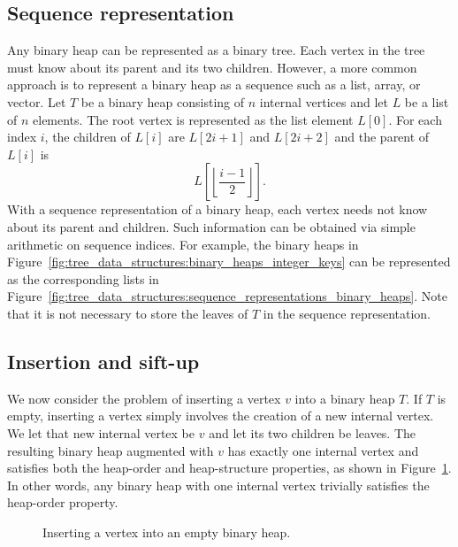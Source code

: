 
\subsection{Sequence representation}

Any binary heap can be represented as a binary tree. Each vertex in
the tree must know about its parent and its two children. However, a
more common approach is to represent a binary heap as a sequence such
as a list, array, or vector. Let $T$ be a binary heap consisting of
$n$ internal vertices and let $L$ be a list of $n$ elements. The root
vertex is represented as the list element $L[0]$. For each index $i$,
the children of $L[i]$ are $L[2i + 1]$ and $L[2i + 2]$ and the parent
of $L[i]$ is
\[
L\left[ \left\lfloor \frac{i - 1}{2} \right\rfloor \right].
\]
With a sequence representation of a binary heap, each vertex needs not
know about its parent and children. Such information can be obtained
via simple arithmetic on sequence indices. For example, the binary
heaps in
Figure~\ref{fig:tree_data_structures:binary_heaps_integer_keys} can be
represented as the corresponding lists in
Figure~\ref{fig:tree_data_structures:sequence_representations_binary_heaps}.
Note that it is not necessary to store the leaves of $T$ in the
sequence representation.



\subsection{Insertion and sift-up}
\label{subsec:tree_data_structures:insertion_sift_up}

We now consider the problem of inserting a vertex $v$ into a binary
heap $T$. If $T$ is empty, inserting a vertex simply involves the
creation of a new internal vertex. We let that new internal vertex be
$v$ and let its two children be leaves. The resulting binary heap
augmented with $v$ has exactly one internal vertex and satisfies both
the heap-order and heap-structure properties, as shown in
Figure~\ref{fig:tree_data_structures:insert_vertex_into_empty_binary_heap}.
In other words, any binary heap with one internal vertex trivially
satisfies the heap-order property.

\begin{figure}[!htbp]
\centering

\caption{Inserting a vertex into an empty binary heap.}
\label{fig:tree_data_structures:insert_vertex_into_empty_binary_heap}
\end{figure}

